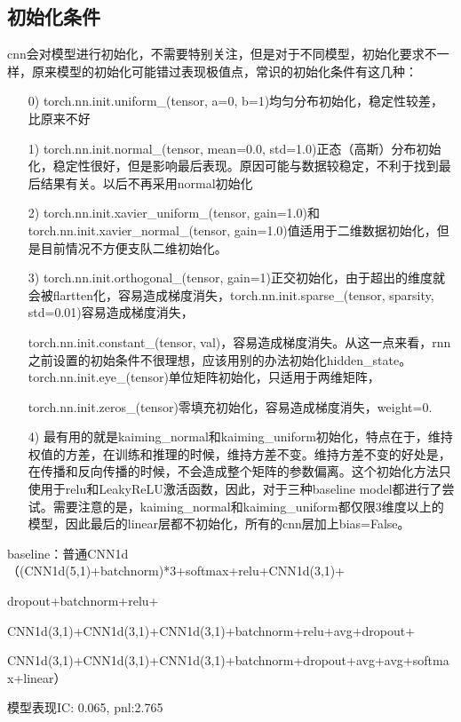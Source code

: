 \documentclass[11pt]{ctexart}
\begin{document}
\subsection{初始化条件}
cnn会对模型进行初始化，不需要特别关注，但是对于不同模型，初始化要求不一样，原来模型的初始化可能错过表现极值点，常识的初始化条件有这几种：
\begin{itemize}
  \item [0)]
    torch.nn.init.uniform\_(tensor, a=0, b=1)均匀分布初始化，稳定性较差，比原来不好
  \item [1)]
    torch.nn.init.normal\_(tensor, mean=0.0, std=1.0)正态（高斯）分布初始化，稳定性很好，但是影响最后表现。原因可能与数据较稳定，不利于找到最后结果有关。以后不再采用normal初始化
  \item [2)]
    torch.nn.init.xavier\_uniform\_(tensor, gain=1.0)和torch.nn.init.xavier\_normal\_(tensor, gain=1.0)值适用于二维数据初始化，但是目前情况不方便支队二维初始化。
  \item [3)]
    torch.nn.init.orthogonal\_(tensor, gain=1)正交初始化，由于超出的维度就会被flartten化，容易造成梯度消失，torch.nn.init.sparse\_(tensor, sparsity, std=0.01)容易造成梯度消失，\par torch.nn.init.constant\_(tensor, val)，容易造成梯度消失。从这一点来看，rnn之前设置的初始条件不很理想，应该用别的办法初始化hidden\_state。torch.nn.init.eye\_(tensor)单位矩阵初始化，只适用于两维矩阵，\par torch.nn.init.zeros\_(tensor)零填充初始化，容易造成梯度消失，weight=0.
  \item [4)]
    最有用的就是kaiming\_normal和kaiming\_uniform初始化，特点在于，维持权值的方差，在训练和推理的时候，维持方差不变。维持方差不变的好处是，在传播和反向传播的时候，不会造成整个矩阵的参数偏离。这个初始化方法只使用于relu和LeakyReLU激活函数，因此，对于三种baseline model都进行了尝试。需要注意的是，kaiming\_normal和kaiming\_uniform都仅限3维度以上的模型，因此最后的linear层都不初始化，所有的cnn层加上bias=False。

\end{itemize}

baseline：普通CNN1d（(CNN1d(5,1)+batchnorm)*3+softmax+relu+CNN1d(3,1)+

dropout+batchnorm+relu+

CNN1d(3,1)+CNN1d(3,1)+CNN1d(3,1)+batchnorm+relu+avg+dropout+

CNN1d(3,1)+CNN1d(3,1)+CNN1d(3,1)+batchnorm+dropout+avg+avg+softmax+linear）

模型表现{\kaishu \small IC: 0.065, pnl:2.765}
\end{document}
